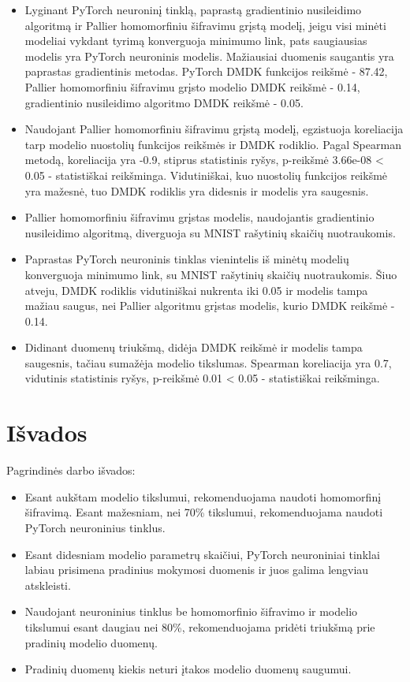 \documentclass{VUMIFInfBakalaurinis}
\begin{document}
\begin{itemize}
    \item Lyginant PyTorch neuroninį tinklą, paprastą gradientinio nusileidimo algoritmą ir Pallier homomorfiniu šifravimu grįstą modelį, jeigu visi minėti modeliai vykdant tyrimą konverguoja minimumo link, pats saugiausias modelis yra PyTorch neuroninis modelis. Mažiausiai duomenis saugantis yra paprastas gradientinis metodas. PyTorch DMDK funkcijos reikšmė - 87.42, Pallier homomorfiniu šifravimu grįsto modelio DMDK reikšmė - 0.14, gradientinio nusileidimo algoritmo DMDK reikšmė - 0.05.
    \item Naudojant Pallier homomorfiniu šifravimu grįstą modelį, egzistuoja koreliacija tarp modelio nuostolių funkcijos reikšmės ir DMDK rodiklio. Pagal Spearman metodą, koreliacija yra -0.9, stiprus statistinis ryšys, p-reikšmė 3.66e-08 < 0.05 - statistiškai reikšminga. Vidutiniškai, kuo nuostolių funkcijos reikšmė yra mažesnė, tuo DMDK rodiklis yra didesnis ir modelis yra saugesnis.
    \item Pallier homomorfiniu šifravimu grįstas modelis, naudojantis gradientinio nusileidimo algoritmą, diverguoja su MNIST rašytinių skaičių nuotraukomis.
    \item Paprastas PyTorch neuroninis tinklas vienintelis iš minėtų modelių konverguoja minimumo link, su MNIST rašytinių skaičių nuotraukomis. Šiuo atveju, DMDK rodiklis vidutiniškai nukrenta iki 0.05 ir modelis tampa mažiau saugus, nei Pallier algoritmu grįstas modelis, kurio DMDK reikšmė - 0.14.
    \item Didinant duomenų triukšmą, didėja DMDK reikšmė ir modelis tampa saugesnis, tačiau sumažėja modelio tikslumas. Spearman koreliacija yra 0.7, vidutinis statistinis ryšys, p-reikšmė 0.01 < 0.05 - statistiškai reikšminga.
\end{itemize}

\section{Išvados}

\par Pagrindinės darbo išvados:
\begin{itemize}
    \item  Esant aukštam modelio tikslumui, rekomenduojama naudoti homomorfinį šifravimą. Esant mažesniam, nei 70\% tikslumui, rekomenduojama naudoti PyTorch neuroninius tinklus.
    \item Esant didesniam modelio parametrų skaičiui, PyTorch neuroniniai tinklai labiau prisimena pradinius mokymosi duomenis ir juos galima lengviau atskleisti.
    \item Naudojant neuroninius tinklus be homomorfinio šifravimo ir modelio tikslumui esant daugiau nei 80\%, rekomenduojama pridėti triukšmą prie pradinių modelio duomenų.
    \item Pradinių duomenų kiekis neturi įtakos modelio duomenų saugumui.
\end{itemize}
\end{document}
